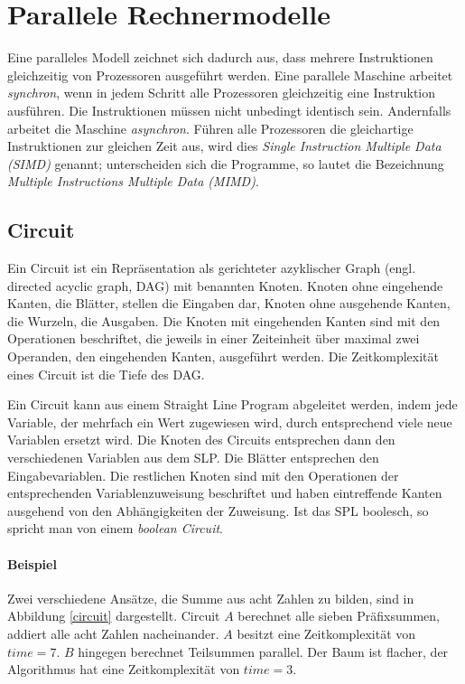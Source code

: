 \section{Parallele Rechnermodelle}
Eine paralleles Modell zeichnet sich dadurch aus, dass mehrere Instruktionen gleichzeitig von Prozessoren ausgeführt werden.
Eine parallele Maschine arbeitet \emph{synchron}, wenn in jedem Schritt alle Prozessoren gleichzeitig eine Instruktion ausführen.
Die Instruktionen müssen nicht unbedingt identisch sein.
Andernfalls arbeitet die Maschine \emph{asynchron}.
Führen alle Prozessoren die gleichartige Instruktionen zur gleichen Zeit aus, wird dies \emph{Single Instruction Multiple Data (SIMD)} genannt; unterscheiden sich die Programme, so lautet die Bezeichnung \emph{Multiple Instructions Multiple Data (MIMD)}.

\subsection{Circuit}
Ein Circuit ist ein Repräsentation als gerichteter azyklischer Graph (engl. directed acyclic graph, DAG) mit benannten Knoten.
Knoten ohne eingehende Kanten, die Blätter, stellen die Eingaben dar, Knoten ohne ausgehende Kanten, die Wurzeln, die Ausgaben.
Die Knoten mit eingehenden Kanten sind mit den Operationen beschriftet, die jeweils in einer Zeiteinheit über maximal zwei Operanden, den eingehenden Kanten, ausgeführt werden.
Die Zeitkomplexität eines Circuit ist die Tiefe des DAG.

Ein Circuit kann aus einem Straight Line Program abgeleitet werden, indem jede Variable, der mehrfach ein Wert zugewiesen wird, durch entsprechend viele neue Variablen ersetzt wird.
Die Knoten des Circuits entsprechen dann den verschiedenen Variablen aus dem SLP.
Die Blätter entsprechen den Eingabevariablen.
Die restlichen Knoten sind mit den Operationen der entsprechenden Variablenzuweisung beschriftet und haben eintreffende Kanten ausgehend von den Abhängigkeiten der Zuweisung.
Ist das SPL boolesch, so spricht man von einem \emph{boolean Circuit}.
\cite[S.7]{jaja}\cite[S.11f.]{reif}

\paragraph{Beispiel}
Zwei verschiedene Ansätze, die Summe aus acht Zahlen zu bilden, sind in
Abbildung \ref{circuit} dargestellt.
Circuit $A$ berechnet alle sieben Präfixsummen, addiert alle acht Zahlen
nacheinander.
$A$ besitzt eine Zeitkomplexität von $time = 7$.
$B$ hingegen berechnet Teilsummen parallel.
Der Baum ist flacher, der Algorithmus hat eine Zeitkomplexität von $time = 3$.

